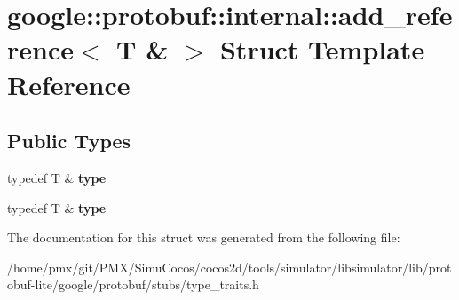 \hypertarget{structgoogle_1_1protobuf_1_1internal_1_1add__reference_3_01T_01_6_01_4}{}\section{google\+:\+:protobuf\+:\+:internal\+:\+:add\+\_\+reference$<$ T \& $>$ Struct Template Reference}
\label{structgoogle_1_1protobuf_1_1internal_1_1add__reference_3_01T_01_6_01_4}
\subsection*{Public Types}
\begin{DoxyCompactItemize}
\item 
\mbox{\label{structgoogle_1_1protobuf_1_1internal_1_1add__reference_3_01T_01_6_01_4_ac7689c983725ee054d6741c78740e978}} 
typedef T \& {\bfseries type}
\item 
\mbox{\label{structgoogle_1_1protobuf_1_1internal_1_1add__reference_3_01T_01_6_01_4_ac7689c983725ee054d6741c78740e978}} 
typedef T \& {\bfseries type}
\end{DoxyCompactItemize}


The documentation for this struct was generated from the following file\+:\begin{DoxyCompactItemize}
\item 
/home/pmx/git/\+P\+M\+X/\+Simu\+Cocos/cocos2d/tools/simulator/libsimulator/lib/protobuf-\/lite/google/protobuf/stubs/type\+\_\+traits.\+h\end{DoxyCompactItemize}
